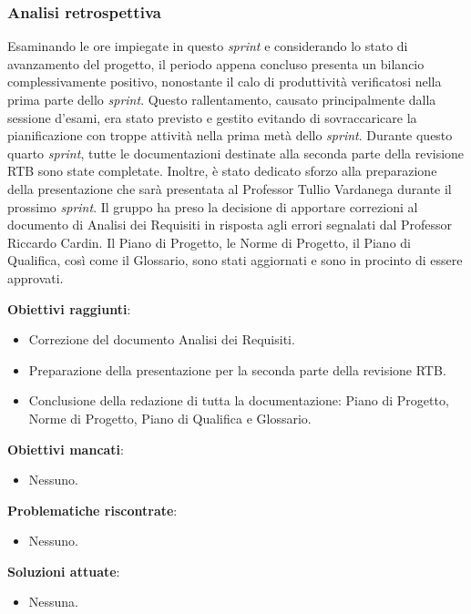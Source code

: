 \subsubsection{Analisi retrospettiva}

Esaminando le ore impiegate in questo \textit{sprint} e considerando lo stato di avanzamento del progetto, il periodo appena concluso presenta un bilancio complessivamente positivo, 
nonostante il calo di produttività verificatosi nella prima parte dello \textit{sprint}. Questo rallentamento, causato principalmente dalla sessione d'esami, era stato previsto e gestito evitando 
di sovraccaricare la pianificazione con troppe attività nella prima metà dello \textit{sprint}.
Durante questo quarto \textit{sprint}, tutte le documentazioni destinate alla seconda parte della revisione RTB sono state completate. Inoltre, è stato dedicato sforzo alla preparazione della 
presentazione che sarà presentata al Professor Tullio Vardanega durante il prossimo \textit{sprint}. Il gruppo ha preso la decisione di apportare correzioni al documento di Analisi dei Requisiti in 
risposta agli errori segnalati dal Professor Riccardo Cardin.
Il Piano di Progetto, le Norme di Progetto, il Piano di Qualifica, così come il Glossario, sono stati aggiornati e sono in procinto di essere approvati.

\textbf{Obiettivi raggiunti}:
\begin{itemize}
	\item Correzione del documento Analisi dei Requisiti.
	\item Preparazione della presentazione per la seconda parte della revisione RTB.
	\item Conclusione della redazione di tutta la documentazione: Piano di Progetto, Norme di Progetto, Piano di Qualifica e Glossario.
\end{itemize}

\textbf{Obiettivi mancati}:
\begin{itemize}
	\item Nessuno.
\end{itemize}

\textbf{Problematiche riscontrate}:
\begin{itemize}
	\item Nessuno.
\end{itemize}

\textbf{Soluzioni attuate}:
\begin{itemize}
	\item Nessuna.
\end{itemize}

